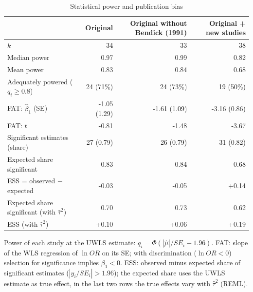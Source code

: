 \begin{table}[htbp]
\centering
\small
\caption{Statistical power and publication bias}
\label{tab:power-bias}
\begin{tabular}{lrrr}
\toprule
 & Original & Original without Bendick (1991) & Original + new studies \\
\midrule
$k$ & 34 & 33 & 38 \\
Median power & 0.97 & 0.99 & 0.82 \\
Mean power & 0.83 & 0.84 & 0.68 \\
Adequately powered ($q_i \geq 0.8$) & 24 (71\%) & 24 (73\%) & 19 (50\%) \\
FAT: $\hat\beta_1$ (SE) & -1.05 (1.29) & -1.61 (1.09) & -3.16 (0.86) \\
FAT: $t$ & -0.81 & -1.48 & -3.67 \\
Significant estimates (share) & 27 (0.79) & 26 (0.79) & 31 (0.82) \\
Expected share significant & 0.83 & 0.84 & 0.68 \\
ESS = observed $-$ expected & -0.03 & -0.05 & +0.14 \\
Expected share significant (with $\hat\tau^2$) & 0.70 & 0.73 & 0.62 \\
ESS (with $\hat\tau^2$) & +0.10 & +0.06 & +0.19 \\
\bottomrule
\end{tabular}
\par\smallskip\parbox{0.95\linewidth}{\footnotesize Power of each study at the UWLS estimate: $q_i = \Phi(|\hat\mu|/SE_i - 1.96)$. FAT: slope of the WLS regression of $\ln OR$ on its SE; with discrimination ($\ln OR<0$) selection for significance implies $\beta_1<0$. ESS: observed minus expected share of significant estimates ($|y_i/SE_i|>1.96$); the expected share uses the UWLS estimate as true effect, in the last two rows the true effects vary with $\hat\tau^2$ (REML).}
\end{table}
